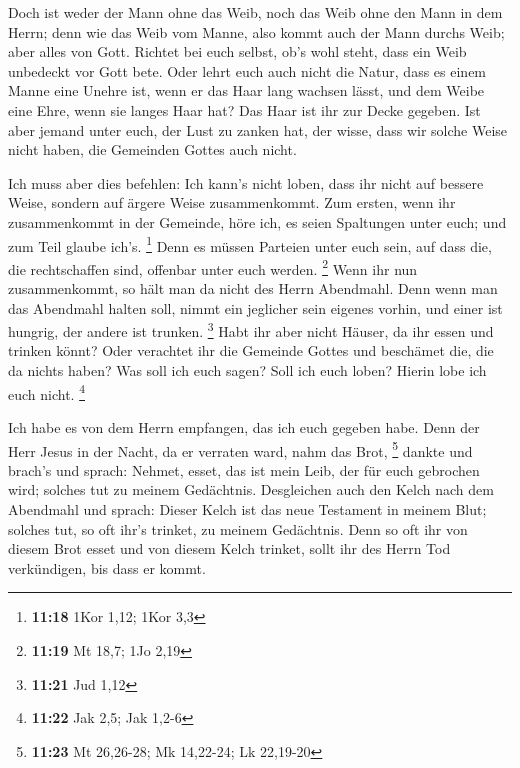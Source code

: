  Doch ist weder der Mann ohne das Weib, noch das Weib ohne
den Mann in dem Herrn;  denn wie das Weib vom Manne, also
kommt auch der Mann durchs Weib; aber alles von Gott. 
Richtet bei euch selbst, ob's wohl steht, dass ein Weib unbedeckt vor
Gott bete.  Oder lehrt euch auch nicht die Natur, dass es
einem Manne eine Unehre ist, wenn er das Haar lang wachsen lässt,
 und dem Weibe eine Ehre, wenn sie langes Haar hat? Das
Haar ist ihr zur Decke gegeben.  Ist aber jemand unter
euch, der Lust zu zanken hat, der wisse, dass wir solche Weise nicht
haben, die Gemeinden Gottes auch nicht.

 Ich muss aber dies befehlen: Ich kann's nicht loben, dass
ihr nicht auf bessere Weise, sondern auf ärgere Weise zusammenkommt.
 Zum ersten, wenn ihr zusammenkommt in der Gemeinde, höre
ich, es seien Spaltungen unter euch; und zum Teil glaube ich's.
\footnote{\textbf{11:18} 1Kor 1,12; 1Kor 3,3}  Denn es
müssen Parteien unter euch sein, auf dass die, die rechtschaffen sind,
offenbar unter euch werden. \footnote{\textbf{11:19} Mt 18,7; 1Jo 2,19}
 Wenn ihr nun zusammenkommt, so hält man da nicht des Herrn
Abendmahl.  Denn wenn man das Abendmahl halten soll, nimmt
ein jeglicher sein eigenes vorhin, und einer ist hungrig, der andere ist
trunken. \footnote{\textbf{11:21} Jud 1,12}  Habt ihr aber
nicht Häuser, da ihr essen und trinken könnt? Oder verachtet ihr die
Gemeinde Gottes und beschämet die, die da nichts haben? Was soll ich
euch sagen? Soll ich euch loben? Hierin lobe ich euch nicht. \footnote{\textbf{11:22}
  Jak 2,5; Jak 1,2-6}

 Ich habe es von dem Herrn empfangen, das ich euch gegeben
habe. Denn der Herr Jesus in der Nacht, da er verraten ward, nahm das
Brot, \footnote{\textbf{11:23} Mt 26,26-28; Mk 14,22-24; Lk 22,19-20}
 dankte und brach's und sprach: Nehmet, esset, das ist mein
Leib, der für euch gebrochen wird; solches tut zu meinem Gedächtnis.
 Desgleichen auch den Kelch nach dem Abendmahl und sprach:
Dieser Kelch ist das neue Testament in meinem Blut; solches tut, so oft
ihr's trinket, zu meinem Gedächtnis.  Denn so oft ihr von
diesem Brot esset und von diesem Kelch trinket, sollt ihr des Herrn Tod
verkündigen, bis dass er kommt.

